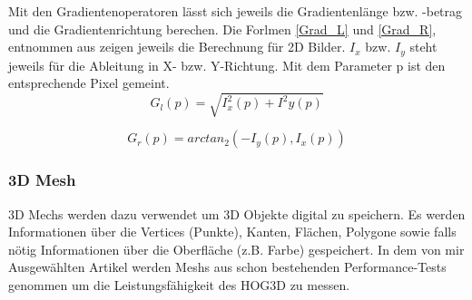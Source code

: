 Mit den Gradientenoperatoren lässt sich jeweils die Gradientenlänge bzw. -betrag und die Gradientenrichtung berechen. Die Forlmen \ref{Grad_L} und \ref{Grad_R}, entnommen aus \cite{Priese15} zeigen jeweils die Berechnung für 2D Bilder. $I_x$ bzw. $I_y$ steht jeweils für die Ableitung in X- bzw. Y-Richtung. Mit dem Parameter p ist den entsprechende Pixel gemeint.
\begin{equation}
\label{Grad_L}
G_l(p) = \sqrt{I^2_x(p)+ I^2 y(p)}
\end{equation}

\begin{equation}
\label{Grad_R}
G_r(p) = arctan_2(- I_y(p),I_x(p))
\end{equation}


\subsubsection{3D Mesh}
3D Mechs werden dazu verwendet um 3D Objekte digital zu speichern. Es werden Informationen über die Vertices (Punkte), Kanten, Flächen, Polygone sowie falls nötig Informationen über die Oberfläche (z.B. Farbe) gespeichert. In dem von mir Ausgewählten Artikel \cite{scherer2010histograms} werden Meshs aus schon bestehenden Performance-Tests genommen um die Leistungsfähigkeit des HOG3D zu messen.